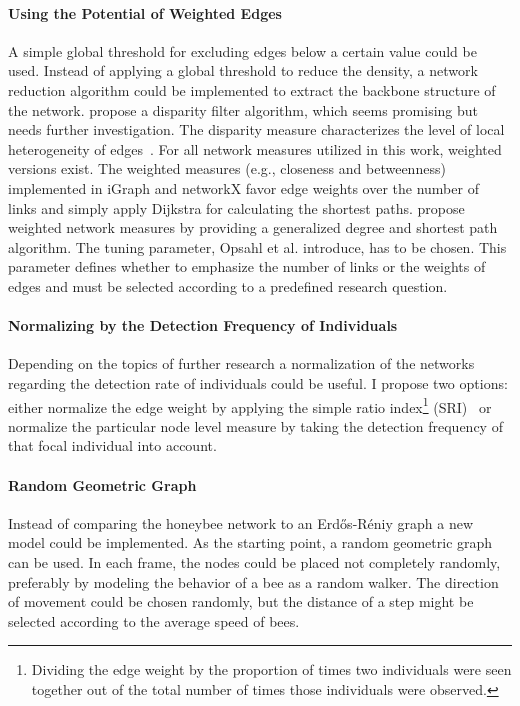 \paragraph{Using the Potential of Weighted Edges}
A simple global threshold for excluding edges below a certain value could be used.
Instead of applying a global threshold to reduce the density, a network reduction algorithm could be implemented to extract the backbone structure of the network.
\textcite{serrano2009extracting} propose a disparity filter algorithm, which seems promising but needs further investigation.
The disparity measure characterizes the level of local heterogeneity of edges~\cite{barthelemy2003spatial}.
For all network measures utilized in this work, weighted versions exist.
The weighted measures (e.g., closeness and betweenness) implemented in iGraph and networkX favor edge weights over the number of links and simply apply Dijkstra for calculating the shortest paths. \textcite{opsahl2010node} propose weighted network measures by providing a generalized degree and shortest path algorithm. The tuning parameter, Opsahl et al. introduce, has to be chosen. This parameter defines whether to emphasize the number of links or the weights of edges and must be selected according to a predefined research question.


\paragraph{Normalizing by the Detection Frequency of Individuals}
Depending on the topics of further research a normalization of the networks regarding the detection rate of individuals could be useful.
I propose two options: either normalize the edge weight by applying the simple ratio index\footnote{Dividing the edge weight by the proportion of times two individuals were seen together out of the total number of times those individuals were observed.} (SRI)~\cite{formica2012fitness} or normalize the particular node level measure by taking the detection frequency of that focal individual into account.

\paragraph{Random Geometric Graph}
Instead of comparing the honeybee network to an Erd\H{o}s-R\'{e}niy graph a new model could be implemented.
As the starting point, a random geometric graph~\cite{rgg2002} can be used.
In each frame, the nodes could be placed not completely randomly, preferably by modeling the behavior of a bee as a random walker.
The direction of movement could be chosen randomly, but the distance of a step might be selected according to the average speed of bees.


